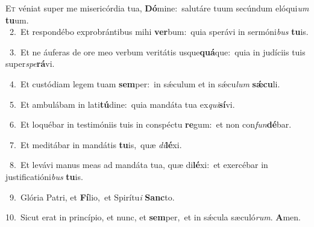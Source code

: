 \lettrine{\initial\textcolor{\initialcolor}{E}}{t} véniat super me misericórdia tua, \textbf{Dó}\-mine:~\star salutáre tuum secúndum elóqui\textit{um} \textbf{tu}\-um.\\
{\numbfont\textcolor{\numbcolor}{~2.}}~Et respondébo exprobrántibus mihi \textbf{ver}\-bum:~\star quia sperávi in sermóni\textit{bus} \textbf{tu}\-is.\par
{\numbfont\textcolor{\numbcolor}{~3.}}~Et ne áuferas de ore meo verbum veritátis usque\-\textbf{quá}\-que:~\star quia in judíciis tuis super\-\textit{spe}\-\textbf{rá}vi.\par
{\numbfont\textcolor{\numbcolor}{~4.}}~Et custódiam legem tuam \textbf{sem}\-per:~\star in sǽculum et in sǽcu\textit{lum} \textbf{sǽ}\-\textbf{cu}li.\par
{\numbfont\textcolor{\numbcolor}{~5.}}~Et ambulábam in lati\-\textbf{tú}\-dine:~\star quia mandáta tua ex\-\textit{qui}\-\textbf{sí}vi.\par
{\numbfont\textcolor{\numbcolor}{~6.}}~Et loquébar in testimóniis tuis in conspéctu \textbf{re}\-gum:~\star et non con\-\textit{fun}\-\textbf{dé}bar.\par
{\numbfont\textcolor{\numbcolor}{~7.}}~Et meditábar in mandátis \textbf{tu}\-is,~\star quæ \textit{di}\-\textbf{lé}xi.\par
{\numbfont\textcolor{\numbcolor}{~8.}}~Et levávi manus meas ad mandáta tua, quæ di\-\textbf{lé}\-xi:~\star et exercébar in justificatióni\textit{bus} \textbf{tu}\-is.\par
{\numbfont\textcolor{\numbcolor}{~9.}}~Glória Patri, et \textbf{Fí}\-lio,~\star et Spirítu\textit{i} \textbf{Sanc}\-to.\par
{\numbfont\textcolor{\numbcolor}{10.}}~Sicut erat in princípio, et nunc, et \textbf{sem}\-per,~\star et in sǽcula sæculó\-\textit{rum}\-. \textbf{A}\-men.\par
